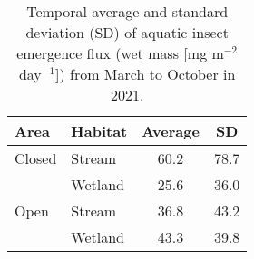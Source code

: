 \begin{table}[ht]
\centering
\caption{Temporal average and standard deviation (SD) of aquatic insect emergence flux (wet mass [mg m$^{-2}$ day$^{-1}$]) from March to October in 2021.} 
\label{tab:emg}
\begingroup\small
\begin{tabular}{llcc}
  \hline
Area & Habitat & Average & SD \\ 
  \hline
Closed & Stream & 60.2 & 78.7 \\ 
   & Wetland & 25.6 & 36.0 \\ 
  Open & Stream & 36.8 & 43.2 \\ 
   & Wetland & 43.3 & 39.8 \\ 
   \hline
\end{tabular}
\endgroup
\end{table}
